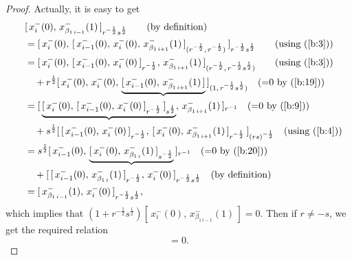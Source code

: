 \documentclass{amsproc}
\theoremstyle{remark}
\numberwithin{equation}{section}
\begin{document}
\begin{proof}
Actually, it is easy to get
\begin{eqnarray*}
\begin{split}
&\quad[\,x_i^-{(0)},\, x_{\beta_{1\,i-1}}^-(1)\,]_{r^{-\frac{1}{2}}s^{\frac{1}{2}}}
\qquad {\hbox{(by definition)}}\\
&\quad=[\,x_i^-(0),\,[\,x_{i-1}^-(0),\,x_i^-(0),\,x_{\beta_{1\,i+1}}^-(1)
\,]_{(r^{-\frac{1}{2}},\,r^{-\frac{1}{2}})}\,]_{r^{-\frac{1}{2}}s^{\frac{1}{2}}}
\qquad {\hbox{(using (\ref{b:3}))}}\\
&\quad=[\,x_i^-(0),\,[\,x_{i-1}^-(0),\,x_i^-(0)\,]_{r^{-\frac{1}{2}}}
,\,x_{\beta_{1\,i+1}}^-(1)\,]_{(r^{-\frac{1}{2}},\,r^{-\frac{1}{2}}s^{\frac{1}{2}})}
\qquad {\hbox{(using (\ref{b:3}))}}\\
&\qquad+r^{\frac{1}{2}}[\,x_i^-(0),\,x_i^-(0),\,
\underbrace{[\,x_{i-1}^-(0),\,x_{\beta_{1\,i+1}}^-(1)\,]}
\,]_{(1,\,r^{-\frac{1}{2}}s^{\frac{1}{2}})}\quad {\hbox{(=0 by (\ref{b:19}))}}\\
&\quad=[\,\underbrace{[\,x_i^-(0),\,[\,x_{i-1}^-(0),\,x_i^-(0)\,]_{r^{-\frac{1}{2}}}
\,]_{s^{\frac{1}{2}}}}
,\,x_{\beta_{1\,i+1}}^-(1)\,]_{r^{-1}}\quad {\hbox{(=0 by (\ref{b:9}))}}\\
&\qquad+s^{\frac{1}{2}}[\,[\,x_{i-1}^-(0),\,x_i^-(0)\,]_{r^{-\frac{1}{2}}}
,\,[\,x_{i}^-(0),\,x_{\beta_{1\,i+1}}^-(1)\,]_{r^{-\frac{1}{2}}}
\,]_{(rs)^{-\frac{1}{2}}}\quad {\hbox{(using (\ref{b:4}))}}\\
&\quad=s^{\frac{1}{2}}[\,x_{i-1}^-(0),\,
\underbrace{[\,x_i^-(0),\,x_{\beta_{1\,i}}^-(1)\,]_{s^{-\frac{1}{2}}}}
\,]_{r^{-1}}\quad {\hbox{(=0 by (\ref{b:20}))}}\\
&\qquad+[\,[\,x_{i-1}^-(0),\,x_{\beta_{1\,i}}^-(1)\,]_{r^{-\frac{1}{2}}}
,\,x_{i}^-(0)\,]_{r^{-\frac{1}{2}}s^{\frac{1}{2}}}
\quad {\hbox{(by definition)}}\\
&\quad=[\,x_{\beta_{1\,i-1}}^-(1),\,x_{i}^-(0)\,]_{r^{-\frac{1}{2}}s^{\frac{1}{2}}},
\end{split}
\end{eqnarray*}
which implies that
$(1+r^{-\frac{1}{2}}s^{\frac{1}{2}})[\,x_i^-(0),\,
x_{\beta_{1\,i-1}}^-(1)\,]=0.$  Then if $r\ne -s$, we get the
required relation
\begin{equation}
[\,x_i^-(0),\,x_{\beta_{1,i-1}}^-(1)\,]=0.
\end{equation}


\end{proof}
\end{document}
